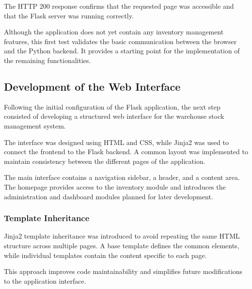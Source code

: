 The HTTP 200 response confirms that the requested
page was accessible and that the Flask server was
running correctly.

Although the application does not yet contain any
inventory management features, this first test validates
the basic communication between the browser and the
Python backend. It provides a starting point for the
implementation of the remaining functionalities.


\subsection{Development of the Web Interface}

Following the initial configuration of the Flask application,
the next step consisted of developing a structured web interface
for the warehouse stock management system.

The interface was designed using HTML and CSS, while Jinja2
was used to connect the frontend to the Flask backend.
A common layout was implemented to maintain consistency
between the different pages of the application.

The main interface contains a navigation sidebar, a header,
and a content area. The homepage provides access to the
inventory module and introduces the administration and
dashboard modules planned for later development.

\subsubsection{Template Inheritance}

Jinja2 template inheritance was introduced to avoid repeating
the same HTML structure across multiple pages. A base template
defines the common elements, while individual templates
contain the content specific to each page.

This approach improves code maintainability and simplifies
future modifications to the application interface.

